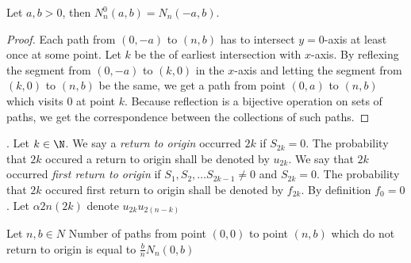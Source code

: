 \begin{thm}\label{thm-reflection_principle}
 Let $a,b >0$, then $N_n^0 \left( a,b \right) =N_n \left( -a,b \right) $.
\end{thm}
\begin{proof}
 Each path from $ \left( 0,-a \right) $ to $ \left( n,b \right) $ has to intersect $y=0$-axis at least once at some point.
 Let $k$ be the \Time of earliest intersection with $x$-axis. By reflexing the segment from $\left( 0,-a \right)$ to $\left( k,0 \right)$ in the $x$-axis and letting the segment from $\left(k,0\right)$ to $\left(n,b\right)$ be the same,
 we get a path from point $\left( 0,a \right)$ to $ \left(n,b\right)$ which visits $0$ at point $k$.
 Because reflection is a bijective operation on sets of paths, we get the correspondence between the collections of such paths.
\end{proof}
\begin{defn}\label{defn-return_origin}
 \Lrw. Let $k \in \N$. We say a \emph{return to origin} occurred \intime $2k$ if $S_{2k}=0$. The probability that \intime $2k$ occured a return to origin shall be denoted by $u_{2k}$.
 We say that \intime $2k$ occurred \emph{first return to origin} if $S_1, S_2, \ldots S_{2k-1}\neq 0$ and $S_{2k}=0$.
 The probability that \intime $2k$ occured first return to origin shall be denoted by $f_{2k}$. By definition $f_0=0$.
 Let $\alpha{2n} \left( 2k \right) $ denote $u_{2k}u_{2 \left( n-k \right) }$
\end{defn}
\begin{thm}\label{thm-ballot_theorem}
 Let $n,b \in N$
 Number of paths from point $ \left( 0,0 \right) $ to point $ \left( n,b \right) $ which do not return to origin is equal to $\frac{b}{n}N_n \left( 0,b \right) $
\end{thm}

